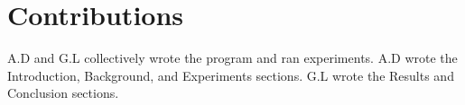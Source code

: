 
\section{Contributions}
\label{sec:contrib}

A.D and G.L collectively wrote the program and ran experiments. A.D wrote the Introduction, Background, and Experiments sections. G.L wrote the Results and Conclusion sections.

